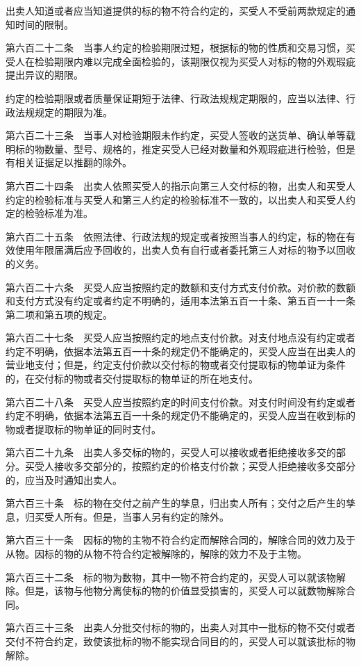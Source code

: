 \documentclass[UTF8,12pt,a4paper]{ctexbook}
\begin{document}
出卖人知道或者应当知道提供的标的物不符合约定的，买受人不受前两款规定的通知时间的限制。

第六百二十二条　当事人约定的检验期限过短，根据标的物的性质和交易习惯，买受人在检验期限内难以完成全面检验的，该期限仅视为买受人对标的物的外观瑕疵提出异议的期限。

约定的检验期限或者质量保证期短于法律、行政法规规定期限的，应当以法律、行政法规规定的期限为准。

第六百二十三条　当事人对检验期限未作约定，买受人签收的送货单、确认单等载明标的物数量、型号、规格的，推定买受人已经对数量和外观瑕疵进行检验，但是有相关证据足以推翻的除外。

第六百二十四条　出卖人依照买受人的指示向第三人交付标的物，出卖人和买受人约定的检验标准与买受人和第三人约定的检验标准不一致的，以出卖人和买受人约定的检验标准为准。

第六百二十五条　依照法律、行政法规的规定或者按照当事人的约定，标的物在有效使用年限届满后应予回收的，出卖人负有自行或者委托第三人对标的物予以回收的义务。

第六百二十六条　买受人应当按照约定的数额和支付方式支付价款。对价款的数额和支付方式没有约定或者约定不明确的，适用本法第五百一十条、第五百一十一条第二项和第五项的规定。

第六百二十七条　买受人应当按照约定的地点支付价款。对支付地点没有约定或者约定不明确，依据本法第五百一十条的规定仍不能确定的，买受人应当在出卖人的营业地支付；但是，约定支付价款以交付标的物或者交付提取标的物单证为条件的，在交付标的物或者交付提取标的物单证的所在地支付。

第六百二十八条　买受人应当按照约定的时间支付价款。对支付时间没有约定或者约定不明确，依据本法第五百一十条的规定仍不能确定的，买受人应当在收到标的物或者提取标的物单证的同时支付。

第六百二十九条　出卖人多交标的物的，买受人可以接收或者拒绝接收多交的部分。买受人接收多交部分的，按照约定的价格支付价款；买受人拒绝接收多交部分的，应当及时通知出卖人。

第六百三十条　标的物在交付之前产生的孳息，归出卖人所有；交付之后产生的孳息，归买受人所有。但是，当事人另有约定的除外。

第六百三十一条　因标的物的主物不符合约定而解除合同的，解除合同的效力及于从物。因标的物的从物不符合约定被解除的，解除的效力不及于主物。

第六百三十二条　标的物为数物，其中一物不符合约定的，买受人可以就该物解除。但是，该物与他物分离使标的物的价值显受损害的，买受人可以就数物解除合同。

第六百三十三条　出卖人分批交付标的物的，出卖人对其中一批标的物不交付或者交付不符合约定，致使该批标的物不能实现合同目的的，买受人可以就该批标的物解除。
\end{document}
